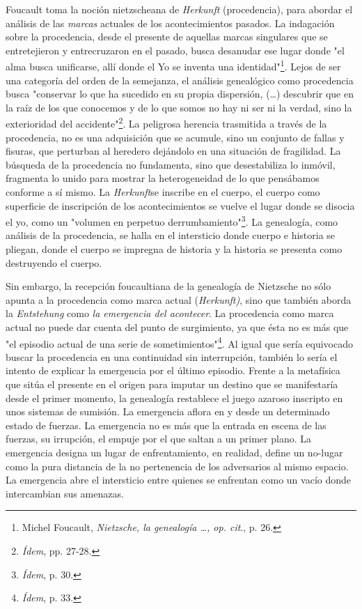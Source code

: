 \documentclass{book}
\begin{document}
Foucault toma la noción nietzscheana de \emph{Herkunft} (procedencia),
para abordar el análisis de las \emph{marcas} actuales de los
acontecimientos pasados. La indagación sobre la procedencia, desde el
presente de aquellas marcas singulares que se entretejieron y
entrecruzaron en el pasado, busca desanudar ese lugar donde "el alma
busca unificarse, allí donde el Yo se inventa una identidad"\footnote{Michel
  Foucault, \emph{Nietzsche, la genealogía \ldots, op. cit}., p. 26.}.
Lejos de ser una categoría del orden de la semejanza, el análisis
genealógico como procedencia busca "conservar lo que ha sucedido en su
propia dispersión, (\dots) descubrir que en la raíz de los que
conocemos y de lo que somos no hay ni ser ni la verdad, sino la
exterioridad del accidente"\footnote{\emph{Ídem}, pp. 27-28.}. La
peligrosa herencia trasmitida a través de la procedencia, no es una
adquisición que se acumule, sino un conjunto de fallas y fisuras, que
perturban al heredero dejándolo en una situación de fragilidad. La
búsqueda de la procedencia no fundamenta, sino que desestabiliza lo
inmóvil, fragmenta lo unido para mostrar la heterogeneidad de lo que
pensábamos conforme a sí mismo. La \emph{Herkunft}se inscribe en el
cuerpo, el cuerpo como superficie de inscripción de los acontecimientos
se vuelve el lugar donde se disocia el yo, como un "volumen en perpetuo
derrumbamiento"\footnote{\emph{Ídem}, p. 30.}. La genealogía, como
análisis de la procedencia, se halla en el intersticio donde cuerpo e
historia se pliegan, donde el cuerpo se impregna de historia y la
historia se presenta como destruyendo el cuerpo.

Sin embargo, la recepción foucaultiana de la genealogía de Nietzsche no
sólo apunta a la procedencia como marca actual (\emph{Herkunft)}, sino
que también aborda la \emph{Entstehung} como \emph{la emergencia del
acontecer}. La procedencia como marca actual no puede dar cuenta del
punto de surgimiento, ya que ésta no es más que "el episodio actual de
una serie de sometimientos"\footnote{\emph{Ídem}, p. 33.}. Al igual que
sería equivocado buscar la procedencia en una continuidad sin
interrupción, también lo sería el intento de explicar la emergencia por
el último episodio. Frente a la metafísica que sitúa el presente en el
origen para imputar un destino que se manifestaría desde el primer
momento, la genealogía restablece el juego azaroso inscripto en unos
sistemas de sumisión. La emergencia aflora en y desde un determinado
estado de fuerzas. La emergencia no es más que la entrada en escena de
las fuerzas, su irrupción, el empuje por el que saltan a un primer
plano. La emergencia designa un lugar de enfrentamiento, en realidad,
define un no-lugar como la pura distancia de la no pertenencia de los
adversarios al mismo espacio. La emergencia abre el intersticio entre
quienes se enfrentan como un vacío donde intercambian sus amenazas.
\end{document}
